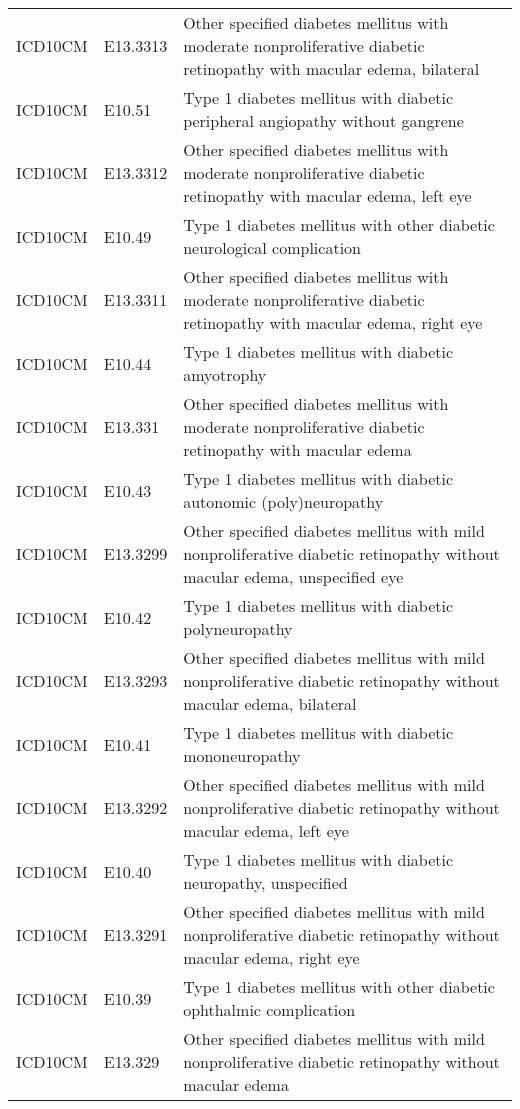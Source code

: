 \begin{table}[ht]
\begin{tabular}{lll}
  ICD10CM & E13.3313 & Other specified diabetes mellitus with moderate nonproliferative diabetic retinopathy with macular edema, bilateral \\ 
  ICD10CM & E10.51 & Type 1 diabetes mellitus with diabetic peripheral angiopathy without gangrene \\ 
  ICD10CM & E13.3312 & Other specified diabetes mellitus with moderate nonproliferative diabetic retinopathy with macular edema, left eye \\ 
  ICD10CM & E10.49 & Type 1 diabetes mellitus with other diabetic neurological complication \\ 
  ICD10CM & E13.3311 & Other specified diabetes mellitus with moderate nonproliferative diabetic retinopathy with macular edema, right eye \\ 
  ICD10CM & E10.44 & Type 1 diabetes mellitus with diabetic amyotrophy \\ 
  ICD10CM & E13.331 & Other specified diabetes mellitus with moderate nonproliferative diabetic retinopathy with macular edema \\ 
  ICD10CM & E10.43 & Type 1 diabetes mellitus with diabetic autonomic (poly)neuropathy \\ 
  ICD10CM & E13.3299 & Other specified diabetes mellitus with mild nonproliferative diabetic retinopathy without macular edema, unspecified eye \\ 
  ICD10CM & E10.42 & Type 1 diabetes mellitus with diabetic polyneuropathy \\ 
  ICD10CM & E13.3293 & Other specified diabetes mellitus with mild nonproliferative diabetic retinopathy without macular edema, bilateral \\ 
  ICD10CM & E10.41 & Type 1 diabetes mellitus with diabetic mononeuropathy \\ 
  ICD10CM & E13.3292 & Other specified diabetes mellitus with mild nonproliferative diabetic retinopathy without macular edema, left eye \\ 
  ICD10CM & E10.40 & Type 1 diabetes mellitus with diabetic neuropathy, unspecified \\ 
  ICD10CM & E13.3291 & Other specified diabetes mellitus with mild nonproliferative diabetic retinopathy without macular edema, right eye \\ 
  ICD10CM & E10.39 & Type 1 diabetes mellitus with other diabetic ophthalmic complication \\ 
  ICD10CM & E13.329 & Other specified diabetes mellitus with mild nonproliferative diabetic retinopathy without macular edema \\ 

\end{tabular}
\end{table}
